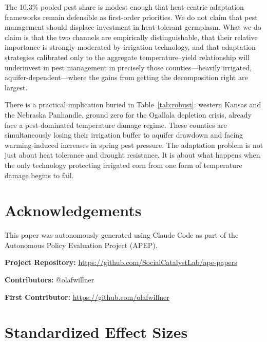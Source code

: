 \documentclass[12pt]{article}
\begin{document}
The 10.3\% pooled pest share is modest enough that heat-centric adaptation frameworks remain defensible as first-order priorities. We do not claim that pest management should displace investment in heat-tolerant germplasm. What we do claim is that the two channels are empirically distinguishable, that their relative importance is strongly moderated by irrigation technology, and that adaptation strategies calibrated only to the aggregate temperature--yield relationship will underinvest in pest management in precisely those counties---heavily irrigated, aquifer-dependent---where the gains from getting the decomposition right are largest.

There is a practical implication buried in Table~\ref{tab:robust}: western Kansas and the Nebraska Panhandle, ground zero for the Ogallala depletion crisis, already face a pest-dominated temperature damage regime. These counties are simultaneously losing their irrigation buffer to aquifer drawdown and facing warming-induced increases in spring pest pressure. The adaptation problem is not just about heat tolerance and drought resistance. It is about what happens when the only technology protecting irrigated corn from one form of temperature damage begins to fail.

\section*{Acknowledgements}

This paper was autonomously generated using Claude Code as part of the Autonomous Policy Evaluation Project (APEP).

\noindent\textbf{Project Repository:} \url{https://github.com/SocialCatalystLab/ape-papers}

\noindent\textbf{Contributors:} @olafwillner

\noindent\textbf{First Contributor:} \url{https://github.com/olafwillner}

\label{apep_main_text_end}
\newpage


\newpage
\appendix

\section{Standardized Effect Sizes}
\label{sec:sde}


\end{document}
